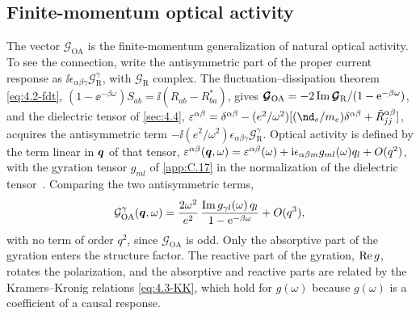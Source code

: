 \subsection{Finite-momentum optical activity}\label{sec:14.5-oa}

The vector $\boldsymbol{\mathcal{G}}_{\mathrm{OA}}$ is the finite-momentum generalization of natural optical activity. To see the connection, write the antisymmetric part of the proper current response as $\ii\epsilon_{\alpha\beta\gamma}\mathcal{G}^\gamma_{\mathrm{R}}$, with $\boldsymbol{\mathcal{G}}_{\mathrm{R}}$ complex. The fluctuation--dissipation theorem \cref{eq:4.2-fdt}, $(1 - \ee^{-\beta\omega})S_{ab} = \ii(R_{ab} - R_{ba}^*)$, gives $\boldsymbol{\mathcal{G}}_{\mathrm{OA}} = -2\operatorname{Im}\boldsymbol{\mathcal{G}}_{\mathrm{R}}/(1 - \mathrm{e}^{-\beta\omega})$, and the dielectric tensor of \cref{sec:4.4}, $\varepsilon^{\alpha\beta} = \delta^{\alpha\beta} - (e^2/\omega^2)[(\nd_e/m_e)\delta^{\alpha\beta} + \tilde R^{\alpha\beta}_{jj}]$, acquires the antisymmetric term $-\ii(e^2/\omega^2)\epsilon_{\alpha\beta\gamma}\mathcal{G}^\gamma_{\mathrm{R}}$. Optical activity is defined by the term linear in $\bm{q}$ of that tensor, $\varepsilon^{\alpha\beta}(\bm{q},\omega) = \varepsilon^{\alpha\beta}(\omega) + \mathrm{i}\epsilon_{\alpha\beta m}g_{ml}(\omega)q_l + O(q^2)$, with the gyration tensor $g_{ml}$ of \cref{app:C.17} in the normalization of the dielectric tensor~\cite[Eqs.~(2)--(4)]{zabalo2023natural}. Comparing the two antisymmetric terms,
\begin{equation}
  \mathcal{G}^\gamma_{\mathrm{OA}}(\bm{q},\omega) = \frac{2\omega^2}{e^2}\,\frac{\operatorname{Im} g_{\gamma l}(\omega)\,q_l}{1 - \mathrm{e}^{-\beta\omega}} + O(q^3) ,
  \label{eq:14.5-gyr}
\end{equation}
with no term of order $q^2$, since $\boldsymbol{\mathcal{G}}_{\mathrm{OA}}$ is odd. Only the absorptive part of the gyration enters the structure factor. The reactive part of the gyration, $\operatorname{Re} g$, rotates the polarization, and the absorptive and reactive parts are related by the Kramers--Kronig relations \cref{eq:4.3-KK}, which hold for $g(\omega)$ because $g(\omega)$ is a coefficient of a causal response.

